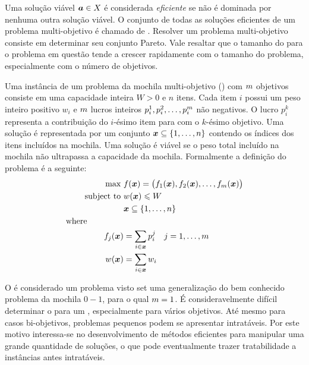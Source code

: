 Uma solução viável $\boldsymbol{a} \in X$ é considerada \emph{eficiente}
se não é dominada por nenhuma outra solução viável.
O conjunto de todas as soluções eficientes de um problema multi-objetivo
é chamado de \emph{\paretoset}.
Resolver um problema multi-objetivo consiste em determinar seu conjunto Pareto.
Vale resaltar que o tamanho do \paretoset para o problema em questão
tende a crescer rapidamente com o tamanho do problema, especialmente com o
número de objetivos.

Uma instância de um problema da mochila multi-objetivo (\mokp) com $m$
objetivos consiste em uma capacidade inteira $W >0$ e $n$ itens.
Cada item $i$ possui um peso inteiro positivo $w_i$ e $m$ lucros inteiros
$p_i^1, p_i^2, \ldots, p_{i}^{m}$ não negativos.
O lucro $p_i^k$ representa a contribuição do $i$-ésimo item
para com o $k$-ésimo objetivo.
Uma solução é representada por um conjunto $\boldsymbol{x} \subseteq \{1, \ldots, n\}$
contendo os índices dos itens incluídos na mochila.
Uma solução é viável se o peso total incluído na mochila não ultrapassa
a capacidade da mochila.
Formalmente a definição do problema é a seguinte:
\begin{align*}
  \text{max   } & f(\boldsymbol{x}) =
    \big(f_1(\boldsymbol{x}) ,f_2(\boldsymbol{x}) ,\ldots ,f_{m}(\boldsymbol{x})\big) \\
  \text{subject to   } & w(\boldsymbol{x}) \leqslant W \\
  & \boldsymbol{x} \subseteq \{1, \ldots, n\}\\
  \text{where} \phantom{mmmmm} \\
  f_j(\boldsymbol{x}) &= \sum_{i \in \boldsymbol{x}} p^j_i \quad j = 1, \ldots, m\\
  w(\boldsymbol{x}) &= \sum_{i \in \boldsymbol{x}} w_i
\end{align*}


O \mokp é considerado um problema \nphard{} visto set uma generalização
do bem conhecido problema da mochila $0-1$, para o qual $m = 1$.
É consideravelmente difícil determinar o \paretoset para um \mokp,
especialmente para vários objetivos.
Até mesmo para casos bi-objetivos, problemas pequenos podem se apresentar
intratáveis.
Por este motivo interessa-se no desenvolvimento de métodos eficientes
para manipular uma grande quantidade de soluções, o que pode eventualmente
trazer tratabilidade a instâncias antes intratáveis.

